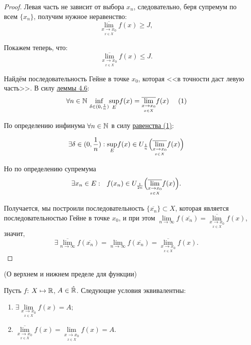 \begin{proof}
    Левая часть не зависит от выбора $x_{n}$, следовательно, беря супремум по всем $\{x_{n}\}$, получим нужное неравенство:
    $$
    \overline{\lim\limits_{\underset{x \in X}{x\to x_0}}} f(x) \geq J,
    $$

    Покажем теперь, что:
    $$  \overline{\lim\limits_{\underset{x \in X}{x\to x_0}}} f(x) \leq J.
    $$

    Найдём последовательность Гейне в точке $x_{0}$, которая <<в точности даст левую часть>>. В силу \hyperlink{lemm4.6}{леммы 4.6}: \hypertarget{prop4.9}
    {}
    $$
    \forall n \in \mathbb{N}  \ \underset{\delta \in (0, \frac{1}{n})}{\inf} \underset{E}{\sup} f(x) = \overline{\lim\limits_{\underset{x \in X}{x\to x_0}}} f(x) \  \quad (1)
    $$



    По определению инфинума  $\forall n \in \mathbb{N}$ в силу \hyperlink{prop4.9}{равенства (1)}: 
    
    $$\exists \delta \in ( 0, \frac{1}{n}): \underset{E}{\sup} f(x) \in U_{\frac{1}{n}} \Bigl( \overline{\lim\limits_{\underset{x \in X}{x\to x_0}}} f(x) \Bigr)$$

    Но по определению супремума
    $$ \exists x_{n}\in E: \ \ f(x_{n}) \in  U_{\frac{1}{2n}} \Bigl( \overline{\lim\limits_{\underset{x \in X}{x\to x_0}}} f(x) \Bigr).$$

    Получается, мы построили последовательность $\{\overline{x_{n}}\} \subset X$, которая является последовательностью Гейне в точке $x_{0}$, и при этом $\lim\limits_{n \to \infty} f(\overline{x_{n}}) = \overline{\lim\limits_{\underset{x \in X}{x\to x_0}}} f(x)$, значит,
     $$\exists \overline{\lim\limits_{n \to \infty}} f(\overline{x_{n}}) = \lim\limits_{n \to \infty} f(\overline{x_{n}}) = \overline{\lim\limits_{\underset{x \in X}{x\to x_0}}} f(x).
    $$
\end{proof}

\begin{theorem}
    \hypertarget{thrm4.10}{(О верхнем и нижнем пределе для функции) }Пусть $f$: $X \mapsto \mathbb{R}$, $A \in \Hat{\mathbb{R}}$. Следующие условия эквивалентны:

\begin{enumerate}
    \item $ \exists \lim\limits_{\underset{x \in X}{x\to x_0}} f(x) = A;$
    \item $\overline{\lim\limits_{\underset{x \in X}{x\to x_0}}} f(x) = \lim\limits_{\underset{x \in X}{\overline{x\to x_0}}} f(x) = A.$
\end{enumerate}    
\end{theorem}


